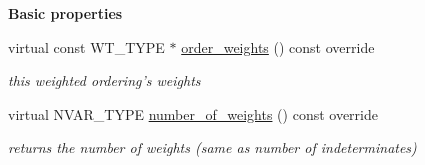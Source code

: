 \begin{Indent}\textbf{ Basic properties}\par
\begin{DoxyCompactItemize}
\item 
\mbox{\label{group__orderinggroup_a2eb6db0248ec4b205d15b5b1b2261db6}} 
virtual const W\+T\+\_\+\+T\+Y\+PE $\ast$ \hyperlink{group__orderinggroup_a2eb6db0248ec4b205d15b5b1b2261db6}{order\+\_\+weights} () const override
\begin{DoxyCompactList}\small\item\em this weighted ordering's weights \end{DoxyCompactList}\item 
\mbox{\label{group__orderinggroup_afd715e453ad062b40578438b1bbe10e9}} 
virtual N\+V\+A\+R\+\_\+\+T\+Y\+PE \hyperlink{group__orderinggroup_afd715e453ad062b40578438b1bbe10e9}{number\+\_\+of\+\_\+weights} () const override
\begin{DoxyCompactList}\small\item\em returns the number of weights (same as number of indeterminates) \end{DoxyCompactList}\end{DoxyCompactItemize}
\end{Indent}
